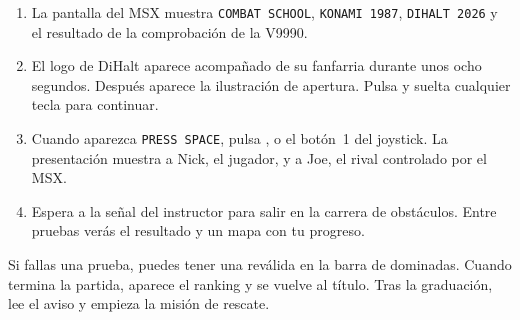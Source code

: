\begin{enumerate}
\item La pantalla del MSX muestra \texttt{COMBAT SCHOOL}, \texttt{KONAMI 1987}, \texttt{DIHALT 2026} y el resultado de la comprobación de la V9990.
\item El logo de DiHalt aparece acompañado de su fanfarria durante unos ocho segundos. Después aparece la ilustración de apertura. Pulsa y suelta cualquier tecla para continuar.
\item Cuando aparezca \texttt{PRESS SPACE}, pulsa ,  o el botón~1 del joystick. La presentación muestra a Nick, el jugador, y a Joe, el rival controlado por el MSX.
\item Espera a la señal del instructor para salir en la carrera de obstáculos. Entre pruebas verás el resultado y un mapa con tu progreso.
\end{enumerate}
Si fallas una prueba, puedes tener una reválida en la barra de dominadas. Cuando termina la partida, aparece el ranking y se vuelve al título. Tras la graduación, lee el aviso y empieza la misión de rescate.
